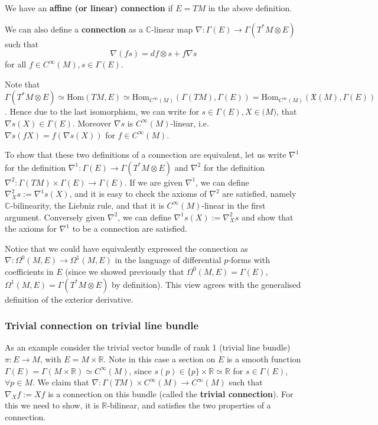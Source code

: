 \documentclass[a4paper]{article}
\theoremstyle{definition} \newtheorem*{definition}{Definition}
\theoremstyle{definition} \newtheorem*{definitions}{Definitions}
\theoremstyle{plain} \newtheorem{theorem}{Theorem}[section]
\theoremstyle{plain} \newtheorem{proposition}[theorem]{Proposition}
\theoremstyle{plain} \newtheorem{corollary}[theorem]{Corollary}
\theoremstyle{plain} \newtheorem{lemma}[theorem]{Lemma}
\theoremstyle{plain} \newtheorem{example}[theorem]{Example}
\newcommand{\defn}[1]{\textbf{#1}}
\newcommand{\realnos}{\mathbb{R}}
\newcommand{\complexnos}{\mathbb{C}}
\newcommand{\Hom}{\text{Hom}}
\newcommand{\smooth}{C^\infty}
\begin{document}
We have an \defn{affine (or linear) connection} if $E=TM$ in the above definition.

We can also define a \defn{connection} as a $\complexnos$-linear map $\nabla : \Gamma(E)\to \Gamma(T^\ast M\otimes E)$ such that 
$$\nabla(fs)=df \otimes s + f\nabla s$$ 
for all $f\in C^\infty(M), s\in \Gamma(E)$.   

Note that $\Gamma(T^*M\otimes E)\simeq \Hom(TM, E)\simeq \Hom_{\smooth(M)}(\Gamma(TM), \Gamma(E)) = \Hom_{\smooth(M)}(\mathfrak{X}(M), \Gamma(E))$. Hence due to the last isomorphism, we can write for $s\in \Gamma(E), X\in \mathfrak(M)$, that $\nabla s(X)\in \Gamma(E)$. Moreover $\nabla s$ is $\smooth(M)$-linear, i.e. $\nabla s(fX)=f(\nabla s (X))$ for $f\in \smooth (M)$.

To show that these two definitions of a connection are equivalent, let us write $\nabla^1$ for the definition $\nabla^1:\Gamma(E)\to \Gamma(T^*M\otimes E)$ and $\nabla^2$ for the definition $\nabla^2:\Gamma(TM)\times \Gamma(E)\to \Gamma(E)$. If we are given $\nabla^1$, we can define $\nabla^2_X s:=\nabla^1 s(X)$, and it is easy to check the axioms of $\nabla^2$ are satisfied, namely $\complexnos$-bilinearity, the Liebniz rule, and that it is $\smooth(M)$-linear in the first argument. Conversely given $\nabla^2$, we can define $\nabla^1 s(X):=\nabla^2_X s$ and show that the axioms for $\nabla^1$ to be a connection are satisfied. 

Notice that we could have equivalently expressed the connection as $\nabla:\Omega^0(M, E)\to \Omega^1(M, E)$ in the language of differential $p$-forms with coefficients in $E$ (since we showed previously that $\Omega^0(M, E)=\Gamma(E)$, $\Omega^1(M, E)=\Gamma(T^*M\otimes E)$ by definition). This view agrees with the generalised definition of the exterior derivative.

\subsubsection{Trivial connection on trivial line bundle}
As an example consider the trivial vector bundle of rank 1 (trivial line bundle)
$\pi:E\to M$, with $E=M\times \realnos$.
Note in this case a section on $E$ is a smooth function $\Gamma(E)=\Gamma(M\times \realnos)\simeq \smooth(M)$, since $s(p)\in \{p\}\times \realnos \simeq \realnos$ for $s\in \Gamma(E)$, $\forall p\in M$.
We claim that $\nabla: \Gamma(TM)\times \smooth(M)\to \smooth(M)$ such that $\nabla_X f := Xf$ is a connection on this bundle (called the \defn{trivial connection}). For this we need to show, it is $\realnos$-bilinear, and satisfies the two properties of a connection. 
\end{document}
